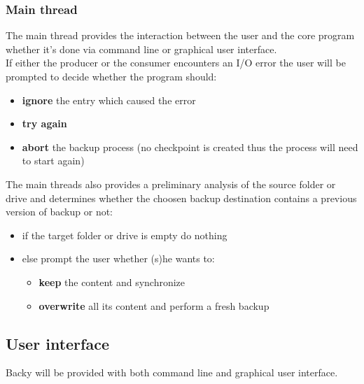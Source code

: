 \documentclass[a4paper]{article}
\begin{document}
      \subsubsection{Main thread}
        The main thread provides the interaction between the user and the core program whether it's done via command line or graphical user interface. \\
        \indent If either the producer or the consumer encounters an I/O error the user will be prompted to decide whether the program should:
        \begin{itemize}
          \item \textbf{ignore} the entry which caused the error
          \item \textbf{try again}
          \item \textbf{abort} the backup process (no checkpoint is created thus the process will need to start again)
        \end{itemize} 
        \indent The main threads also provides a preliminary analysis of the source folder or drive and determines whether the choosen backup destination contains a previous version of backup or not:
        \begin{itemize}
          \item if the target folder or drive is empty do nothing
          \item else prompt the user whether (s)he wants to:
            \begin{itemize}
              \item \textbf{keep} the content and synchronize
              \item \textbf{overwrite} all its content and perform a fresh backup
            \end{itemize}
        \end{itemize}
    \subsection{User interface}
      Backy will be provided with both command line and graphical user interface.
\end{document}
